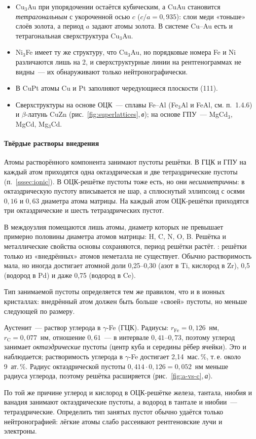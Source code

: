 \begin{itemize}
\item Cu$_3$Au при упорядочении остаётся кубическим, а CuAu становится
\emph{тетрагональным} с укороченной осью $c$ ($c/a=0{,}935$): слои меди
«тоньше» слоёв золота, а период $a$ задают атомы золота. В системе
Cu--Au есть и тетрагональная сверхструктура Cu$_3$Au.
\item Ni$_3$Fe имеет ту же структуру, что Cu$_3$Au, но порядковые номера
Fe и Ni различаются лишь на 2, и сверхструктурные линии на
рентгенограммах не видны~— их обнаруживают только нейтронографически.
\item В CuPt атомы Cu и Pt заполняют чередующиеся плоскости (111).
\item Сверхструктуры на основе ОЦК~— сплавы Fe--Al (Fe$_3$Al и FeAl, см.
п.~1.4.6) и $\beta$-латунь CuZn (рис.~\ref{fig:superlattices},\,\textit{в});
на основе ГПУ~— MgCd$_3$, MgCd, Mg$_3$Cd.
\end{itemize}

\paragraph{Твёрдые растворы внедрения}
Атомы растворённого компонента занимают пустоты решётки. В ГЦК и ГПУ на
каждый атом приходятся одна октаэдрическая и две тетраэдрические
пустоты (п.~\ref{sssec:ionic}). В ОЦК-решётке пустоты тоже есть, но они
\emph{несимметричны}: в октаэдрическую пустоту вписывается не шар, а
сплюснутый эллипсоид с осями $0{,}16$ и $0{,}63$ диаметра атома
матрицы. На каждый атом ОЦК-решётки приходятся три октаэдрические и
шесть тетраэдрических пустот.

В междоузлия помещаются лишь атомы, диаметр которых не превышает
примерно половины диаметра атомов матрицы: H, C, N, O, B. Решётка и
металлические свойства основы сохраняются, период решётки растёт.
: решётки
только из «внедрённых» атомов неметалла не существует. Обычно
растворимость мала, но иногда достигает атомной доли 0,25--0,30 (азот в
Ti, кислород в Zr), 0,5 (водород в Pd) и даже 0,75 (водород в Ce).

Тип занимаемой пустоты определяется тем же правилом, что и в ионных
кристаллах: внедрённый атом должен быть больше «своей» пустоты, но
меньше следующей по размеру.

\begin{primer}[Аустенит]
Аустенит~— раствор углерода в $\gamma$-Fe (ГЦК). Радиусы:
$r_\text{Fe}=0{,}126$~нм, $r_\text{C}=0{,}077$~нм, отношение $0{,}61$~—
в интервале $0{,}41$--$0{,}73$, поэтому углерод занимает
\emph{октаэдрические} пустоты (центр куба и середины рёбер ячейки). Это и
наблюдается; растворимость углерода в $\gamma$-Fe достигает 2,14~мас.\,\%,
т.\,е. около 9~ат.\,\%\isprmark. Радиус октаэдрической пустоты
$0{,}414\cdot0{,}126=0{,}052$~нм меньше радиуса углерода, поэтому решётка
расширяется (рис.~\ref{fig:a-vs-c},\,\textit{а}).
\end{primer}

По той же причине углерод и кислород в ОЦК-решётке железа, тантала,
ниобия и ванадия занимают октаэдрические пустоты, а водород в тантале и
ниобии~— тетраэдрические. Определить тип занятых пустот обычно удаётся
только нейтронографией: лёгкие атомы слабо рассеивают рентгеновские
лучи и электроны.
